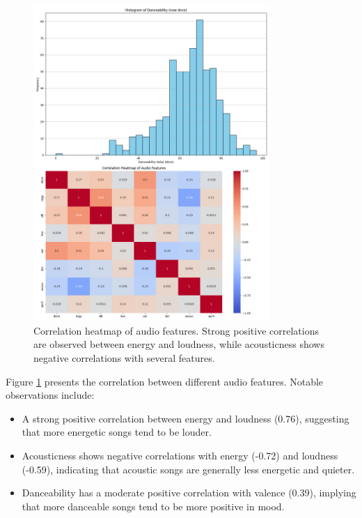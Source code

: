 \documentclass[runningheads]{llncs}
\begin{document}
\begin{figure}[h]
\centering
\includegraphics[width=0.8\textwidth]{correlation_heatmap.png}
\caption{Correlation heatmap of audio features. Strong positive correlations are observed between energy and loudness, while acousticness shows negative correlations with several features.}
\label{fig:correlation}
\end{figure}

Figure \ref{fig:correlation} presents the correlation between different audio features. Notable observations include:

\begin{itemize}
    \item A strong positive correlation between energy and loudness (0.76), suggesting that more energetic songs tend to be louder.
    \item Acousticness shows negative correlations with energy (-0.72) and loudness (-0.59), indicating that acoustic songs are generally less energetic and quieter.
    \item Danceability has a moderate positive correlation with valence (0.39), implying that more danceable songs tend to be more positive in mood.
\end{itemize}
\end{document}
